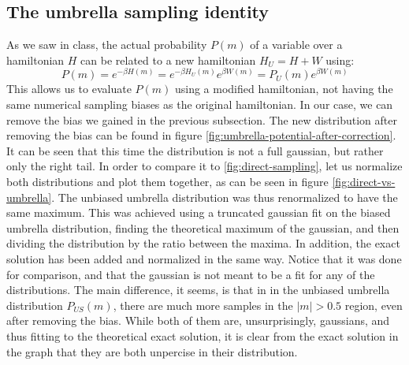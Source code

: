 \documentclass{article}
\begin{document}
\subsection{The umbrella sampling identity}
As we saw in class, the actual probability $P(m)$ of a variable over a hamiltonian $H$ can be related to a new hamiltonian $H_U = H + W$ using:
\begin{equation}
    P(m) = e^{-\beta H(m)} = e^{-\beta H_U(m)}e^{\beta W(m)} = P_U(m)e^{\beta W(m)}
\end{equation}
This allows us to evaluate $P(m)$ using a modified hamiltonian, not having the same numerical sampling biases as the original hamiltonian. In our case, we can remove the bias we gained in the previous subsection. The new distribution after removing the bias can be found in figure \ref{fig:umbrella-potential-after-correction}. It can be seen that this time the distribution is not a full gaussian, but rather only the right tail. In order to compare it to \ref{fig:direct-sampling}, let us normalize both distributions and plot them together, as can be seen in figure \ref{fig:direct-vs-umbrella}.
The unbiased umbrella distribution was thus renormalized to have the same maximum. This was achieved using a truncated gaussian fit on the biased umbrella distribution, finding the theoretical maximum of the gaussian, and then dividing the distribution by the ratio between the maxima. In addition, the exact solution has been added and normalized in the same way. Notice that it was done for comparison, and that the gaussian is not meant to be a fit for any of the distributions.
\newline
The main difference, it seems, is that in in the unbiased umbrella distribution $P_{US}(m)$, there are much more samples in the $|m| > 0.5$ region, even after removing the bias. While both of them are, unsurprisingly, gaussians, and thus fitting to the theoretical exact solution, it is clear from the exact solution in the graph that they are both unpercise in their distribution.
\end{document}
